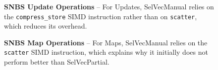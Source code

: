 \documentclass[12pt]{cmuthesis}
\begin{document}
\begin{figure}[t!]
    \centering
    \caption{\textbf{SNBS Update Operations} -- For Updates, SelVecManual relies on the \texttt{compress\_store} SIMD instruction rather than on \texttt{scatter}, which reduces its overhead.}
    \label{fig:snbs_update}
\end{figure}

\begin{figure}[t!]
    \centering
    \caption{\textbf{SNBS Map Operations} -- For Maps, SelVecManual relies on the \texttt{scatter} SIMD instruction, which explains why it initially does not perform better than SelVecPartial.}
    \label{fig:snbs_map}
\end{figure}
\end{document}
